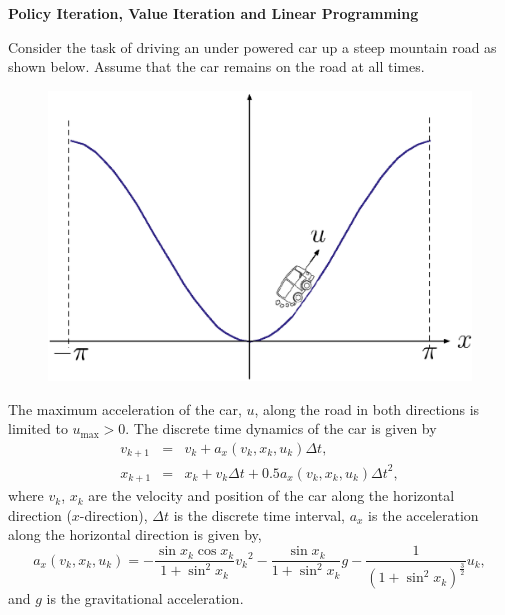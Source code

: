 \documentclass[uebung]{ETHIDSCprogramming_dpoc}
\begin{document}
\maketitle

\begin{center}
\vspace{0.6cm}
\large\textbf{Policy Iteration, Value Iteration and Linear Programming}
\end{center}
\medskip

Consider the task of driving an under powered car up a steep mountain road as shown below. Assume that the car remains on the road at all times.
\begin{figure}[h!]
\begin{center}
    \includegraphics[scale=0.6]{img/mceps.eps}
\end{center}
\end{figure}

The maximum acceleration of the car, $u$, along the road in both directions is limited to $u_{\mathrm{max}}>0$. The discrete time dynamics of the car is given by
\begin{eqnarray}
v_{k+1} &=& v_k + a_x(v_k,x_k,u_k) \Delta t,  \nonumber \\
x_{k+1} &=& x_k + v_k  \Delta t + 0.5 a_x(v_k,x_k,u_k) {\Delta t}^2,  \nonumber
\end{eqnarray}
where $v_k$, $x_k$ are the velocity and position of the car along the horizontal direction ($x$-direction), $\Delta t$ is the discrete time interval, $a_x$ is the acceleration along the horizontal direction is given by,
\begin{equation}
a_x(v_k,x_k,u_k) = -\frac{\sin x_k \cos x_k}{1+\sin^2 x_k} {v_k}^2 -  \frac{\sin x_k}{1+\sin^2 x_k} g -\frac{1}{(1+\sin^2 x_k)^\frac{3}{2}} u_k \nonumber, 
\end{equation}
and $g$ is the gravitational acceleration. 
\end{document}
